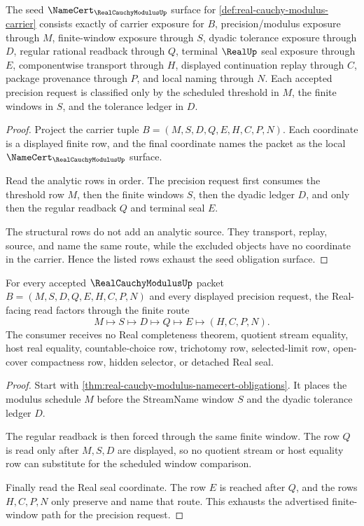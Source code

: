 \begin{theorem}
\label{thm:real-cauchy-modulus-namecert-obligations}
The seed $\NameCert_{\RealCauchyModulusUp}$ surface for \autoref{def:real-cauchy-modulus-carrier} consists exactly of carrier exposure for $B$, precision/modulus exposure through $M$, finite-window exposure through $S$, dyadic tolerance exposure through $D$, regular rational readback through $Q$, terminal $\RealUp$ seal exposure through $E$, componentwise transport through $H$, displayed continuation replay through $C$, package provenance through $P$, and local naming through $N$. Each accepted precision request is classified only by the scheduled threshold in $M$, the finite windows in $S$, and the tolerance ledger in $D$.
\end{theorem}
\begin{proof}
Project the carrier tuple $B=(M,S,D,Q,E,H,C,P,N)$. Each coordinate is a displayed finite row, and the final coordinate names the packet as the local $\NameCert_{\RealCauchyModulusUp}$ surface.

Read the analytic rows in order. The precision request first consumes the threshold row $M$, then the finite windows $S$, then the dyadic ledger $D$, and only then the regular readback $Q$ and terminal seal $E$.

The structural rows do not add an analytic source. They transport, replay, source, and name the same route, while the excluded objects have no coordinate in the carrier. Hence the listed rows exhaust the seed obligation surface.
\end{proof}

\begin{theorem}
\label{thm:real-cauchy-modulus-window-modulus-route}
For every accepted $\RealCauchyModulusUp$ packet $B=(M,S,D,Q,E,H,C,P,N)$ and every displayed precision request, the Real-facing read factors through the finite route
$$
M\longmapsto S\longmapsto D\longmapsto Q\longmapsto E\longmapsto(H,C,P,N).
$$
The consumer receives no Real completeness theorem, quotient stream equality, host real equality, countable-choice row, trichotomy row, selected-limit row, open-cover compactness row, hidden selector, or detached Real seal.
\end{theorem}
\begin{proof}
Start with \autoref{thm:real-cauchy-modulus-namecert-obligations}. It places the modulus schedule $M$ before the StreamName window $S$ and the dyadic tolerance ledger $D$.

The regular readback is then forced through the same finite window. The row $Q$ is read only after $M,S,D$ are displayed, so no quotient stream or host equality row can substitute for the scheduled window comparison.

Finally read the Real seal coordinate. The row $E$ is reached after $Q$, and the rows $H,C,P,N$ only preserve and name that route. This exhausts the advertised finite-window path for the precision request.
\end{proof}

